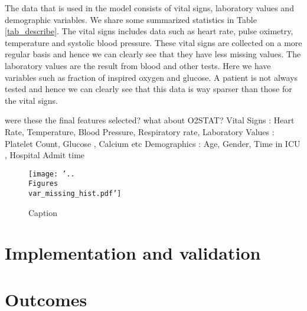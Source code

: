 \documentclass[10pt,letterpaper]{article}
\begin{document}
The data that is used in the model consists of vital signs, laboratory values and demographic variables. We share some summarized statistics in Table \ref{tab_describe}. The vital signs includes data such as heart rate, pulse oximetry, temperature and systolic blood pressure. These vital signs are collected on a more regular basis and hence we can clearly see that they have less missing values. The laboratory values are the result from blood and other tests. Here we have variables such as fraction of inspired oxygen and glucose. A patient is not always tested and hence we can clearly see that this data is way sparser than those for the vital signs.



were these the final features selected? what about O2STAT?
Vital Signs : Heart Rate, Temperature, Blood Pressure, Respiratory rate,
Laboratory Values : Platelet Count, Glucose , Calcium etc
Demographics : Age, Gender, Time in ICU , Hospital Admit time




\begin{figure}
    \centering
    \texttt{[image: '..\\Figures\\var\_missing\_hist.pdf']}
    \caption{Caption}
    \label{fig:my_label}
\end{figure}

\section*{Implementation and validation}



\section*{Outcomes}

\end{document}
